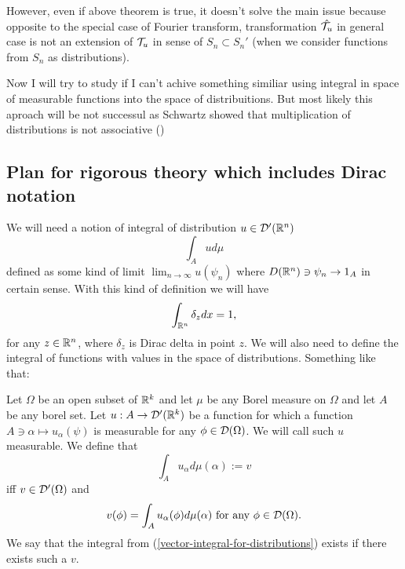 \documentclass[main.tex]{subfiles}
\begin{document}
However, even if above theorem is true, it doesn't solve the main issue because opposite to the special case of Fourier transform, transformation $\hat{\mathcal{T}_u}$ in general case is not an extension of $\mathcal{T}_u$ in sense of $S_n\subset S_n'$ (when we consider functions from $S_n$ as distributions).

Now I will try to study if I can't achive something similiar using integral in space of measurable functions into the space of distribuitions. But most likely this aproach will be not successul as Schwartz showed that multiplication of distributions is not associative (\cite[see][XIX. Theory of Distributions 7. Operations of distributions]{maurin1980})
\subsection{Plan for rigorous theory which includes Dirac notation}
\label{dirac-plan}
We will need a notion of integral of distribution $u\in\mathcal{D}'(\mathbb{R}^n)$
\begin{equation}
\int_A u d\mu
\end{equation}
defined as some kind of limit $\lim_{n\to \infty}u(\psi_n)$ where $D(\mathbb{R}^n)\ni\psi_n\to 1_A$ in certain sense.
With this kind of definition we will have
\begin{equation}
\int_{\mathbb{R}^n} \delta_z dx = 1,
\end{equation} 
for any $z\in\mathbb{R}^n$, where $\delta_z$ is Dirac delta in point $z$.
We will also need to define the integral of functions with values in the space of distributions. Something like that:
\begin{definition}
\label{def-vector-integral-for-distributions}
Let $\Omega$ be an open subset of $\mathbb{R}^k$ and 
let $\mu$ be any Borel measure on $\Omega$ and let $A$ be any borel set. Let $u:A\to\mathcal{D}'(\mathbb{R}^k)$ be a function for which a function $A\ni \alpha\mapsto u_\alpha(\psi)$ is measurable for any $\phi\in \mathcal{D}(\Omega)$. We will call such $u$ measurable. We define that 
\begin{equation}
\label{vector-integral-for-distributions}
\int_A u_\alpha d\mu(\alpha):= v
\end{equation}
iff $v\in \mathcal{D}'(\Omega)$ and 
\begin{equation}
v(\phi) = \int_A u_\alpha(\phi) d\mu(\alpha) \text{ for any } \phi\in \mathcal{D}(\Omega).
\end{equation}
We say that the integral from (\ref{vector-integral-for-distributions}) exists if there exists such a $v$.   
\end{definition}
\end{document}
